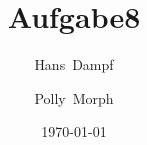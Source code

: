\documentclass{book}
\begin{document}
    \title{Aufgabe8}
    \author{Hans~Dampf \and Polly~Morph}
    \date{\today}
    \maketitle

\tableofcontents




\end{document}
